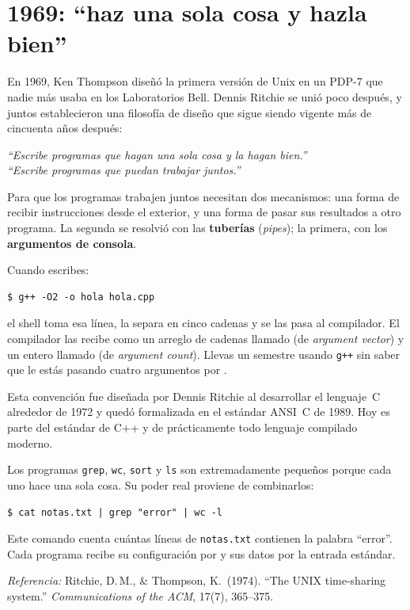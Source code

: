 \documentclass[12pt, oneside]{article}
\begin{document}

\tableofcontents
\newpage

\section{1969: ``haz una sola cosa y hazla bien''}

En 1969, Ken Thompson diseñó la primera versión de Unix en un PDP-7
que nadie más usaba en los Laboratorios Bell.  Dennis Ritchie se unió
poco después, y juntos establecieron una filosofía de diseño que sigue
siendo vigente más de cincuenta años después:

\begin{center}
\textit{``Escribe programas que hagan una sola cosa y la hagan bien.''}\\
\textit{``Escribe programas que puedan trabajar juntos.''}
\end{center}

Para que los programas trabajen juntos necesitan dos mecanismos: una
forma de recibir instrucciones desde el exterior, y una forma de pasar
sus resultados a otro programa.  La segunda se resolvió con las
\textbf{tuberías} (\textit{pipes}); la primera, con los
\textbf{argumentos de consola}.

Cuando escribes:

\begin{verbatim}
$ g++ -O2 -o hola hola.cpp
\end{verbatim}

el shell toma esa línea, la separa en cinco cadenas y se las pasa al
compilador.  El compilador las recibe como un arreglo de cadenas llamado
 (de \textit{argument vector}) y un entero llamado 
(de \textit{argument count}).  Llevas un semestre usando \texttt{g++}
sin saber que le estás pasando cuatro argumentos por .

Esta convención fue diseñada por Dennis Ritchie al desarrollar el
lenguaje~C alrededor de 1972 y quedó formalizada en el estándar
ANSI~C de 1989.  Hoy es parte del estándar de C++ y de prácticamente
todo lenguaje compilado moderno.

\begin{tecnico}
  Los programas \texttt{grep}, \texttt{wc}, \texttt{sort} y \texttt{ls}
  son extremadamente pequeños porque cada uno hace una sola cosa.  Su
  poder real proviene de combinarlos:
  \begin{verbatim}
$ cat notas.txt | grep "error" | wc -l
  \end{verbatim}
  Este comando cuenta cuántas líneas de \texttt{notas.txt} contienen
  la palabra ``error''.  Cada programa recibe su configuración por
   y sus datos por la entrada estándar.
  \par\smallskip
  \textit{Referencia:} Ritchie, D.\,M., \& Thompson, K.~(1974).
  ``The UNIX time-sharing system.''
  \textit{Communications of the ACM}, 17(7), 365--375.
\end{tecnico}
\end{document}
